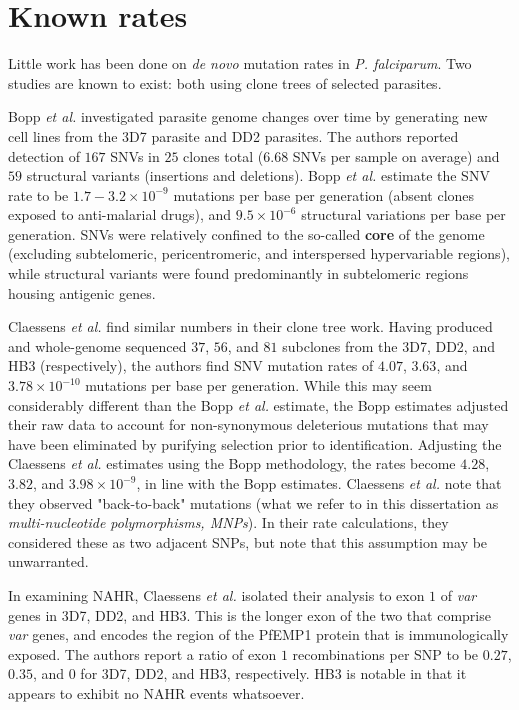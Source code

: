 \section{Known rates}

Little work has been done on \textit{de novo} mutation rates in \textit{P. falciparum}.  Two studies are known to exist: both using clone trees of selected parasites.

Bopp \textit{et al.} investigated parasite genome changes over time by generating new cell lines from the 3D7 parasite and DD2 parasites.  The authors reported detection of $167$ SNVs in $25$ clones total ($6.68$ SNVs per sample on average) and $59$ structural variants (insertions and deletions).  Bopp \textit{et al.} estimate the SNV rate to be $1.7-3.2 \times 10^{-9}$ mutations per base per generation (absent clones exposed to anti-malarial drugs), and $9.5 \times 10^{-6}$ structural variations per base per generation\cite{Bopp:2013gr}.  SNVs were relatively confined to the so-called \textbf{core} of the genome (excluding subtelomeric, pericentromeric, and interspersed hypervariable regions), while structural variants were found predominantly in subtelomeric regions housing antigenic genes.

Claessens \textit{et al.} find similar numbers in their clone tree work.  Having produced and whole-genome sequenced $37$, $56$, and $81$ subclones from the 3D7, DD2, and HB3 (respectively), the authors find SNV mutation rates of $4.07$, $3.63$, and $3.78 \times 10^{-10}$ mutations per base per generation\cite{Claessens:2014fo}.  While this may seem considerably different than the Bopp \textit{et al.} estimate, the Bopp estimates adjusted their raw data to account for non-synonymous deleterious mutations that may have been eliminated by purifying selection prior to identification.  Adjusting the Claessens \textit{et al.} estimates using the Bopp methodology, the rates become $4.28$, $3.82$, and $3.98 \times 10^{-9}$, in line with the Bopp estimates.  Claessens \textit{et al.} note that they observed "back-to-back" mutations (what we refer to in this dissertation as \textit{multi-nucleotide polymorphisms, MNPs}).  In their rate calculations, they considered these as two adjacent SNPs, but note that this assumption may be unwarranted.

In examining NAHR, Claessens \textit{et al.} isolated their analysis to exon $1$ of \textit{var} genes in 3D7, DD2, and HB3.  This is the longer exon of the two that comprise \textit{var} genes, and encodes the region of the PfEMP1 protein that is immunologically exposed.  The authors report a ratio of exon $1$ recombinations per SNP to be $0.27$, $0.35$, and $0$ for 3D7, DD2, and HB3, respectively.  HB3 is notable in that it appears to exhibit no NAHR events whatsoever.


